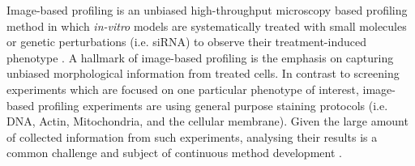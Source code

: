 \begin{flushleft}
Image-based profiling is an unbiased high-throughput microscopy based profiling method in which \textit{in-vitro} models are systematically treated with small molecules or genetic perturbations (i.e. siRNA) to observe their treatment-induced phenotype \parencite{carpenterImagebasedChemicalScreening2007, caicedoApplicationsImagebasedProfiling2016}. A hallmark of image-based profiling is the emphasis on capturing unbiased morphological information from treated cells. In contrast to screening experiments which are focused on one particular phenotype of interest, image-based profiling experiments are using general purpose staining protocols (i.e. DNA, Actin, Mitochondria, and the cellular membrane). Given the large amount of collected information from such experiments, analysing their results is a common challenge and subject of continuous method development \parencite{chandrasekaranImagebasedProfilingDrug2021}. 
\par


\end{flushleft}
